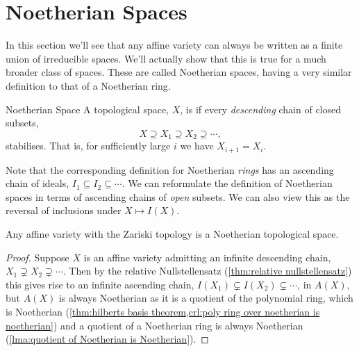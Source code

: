 \documentclass[fleqn]{NotesClass}
\begin{document}
    \section{Noetherian Spaces}
    \label{sec:noetherian spaces}
    In this section we'll see that any affine variety can always be written as a finite union of irreducible spaces.
    We'll actually show that this is true for a much broader class of spaces.
    These are called Noetherian spaces, having a very similar definition to that of a Noetherian ring.
    
    \begin{dfn}{Noetherian Space}{}
        A topological space, \(X\), is  if every \emph{descending} chain of closed subsets,
        \begin{equation}
            X \supseteq X_1 \supseteq X_2 \supseteq \dotsb,
        \end{equation}
        stabilises.
        That is, for sufficiently large \(i\) we have \(X_{i+1} = X_i\).
    \end{dfn}
    
    Note that the corresponding definition for Noetherian \emph{rings} has an ascending chain of ideals, \(I_1 \subseteq I_2 \subseteq \dotsb\).
    We can reformulate the definition of Noetherian spaces in terms of ascending chains of \emph{open} subsets.
    We can also view this as the reversal of inclusions under \(X \mapsto I(X)\).
    
    \begin{lma}{}{}
        Any affine variety with the Zariski topology is a Noetherian topological space.
        \begin{proof}
            Suppose \(X\) is an affine variety admitting an infinite descending chain, \(X_1 \supsetneq X_2 \supsetneq \dotsb\).
            Then by the relative Nullstellensatz (\cref{thm:relative nullstellensatz}) this gives rise to an infinite ascending chain, \(I(X_1) \subsetneq I(X_2) \subsetneq \dotsb\), in \(A(X)\), but \(A(X)\) is always Noetherian as it is a quotient of the polynomial ring, which is Noetherian (\cref{thm:hilberts basis theorem,crl:poly ring over noetherian is noetherian}) and a quotient of a Noetherian ring is always Noetherian (\cref{lma:quotient of Noetherian is Noetherian}).
        \end{proof}
    \end{lma}
    
\end{document}
